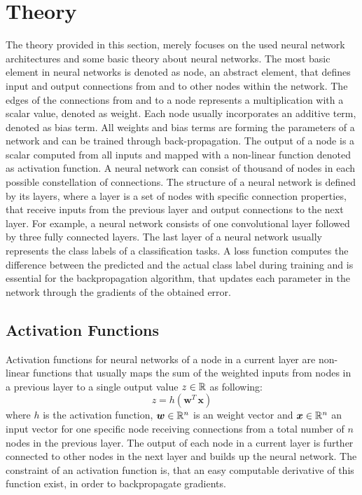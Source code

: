 
\section{Theory}\label{sec:nn_theory}
\thesisStateRevised
The theory provided in this section, merely focuses on the used neural network architectures and some basic theory about neural networks.
The most basic element in neural networks is denoted as node, an abstract element, that defines input and output connections from and to other nodes within the network.
The edges of the connections from and to a node represents a multiplication with a scalar value, denoted as weight.
Each node usually incorporates an additive term, denoted as bias term.
All weights and bias terms are forming the parameters of a network and can be trained through back-propagation.
The output of a node is a scalar computed from all inputs and mapped with a non-linear function denoted as activation function.
A neural network can consist of thousand of nodes in each possible constellation of connections.
The structure of a neural network is defined by its layers, where a layer is a set of nodes with specific connection properties, that receive inputs from the previous layer and output connections to the next layer.
For example, a neural network consists of one convolutional layer followed by three fully connected layers.
The last layer of a neural network usually represents the class labels of a classification tasks.
A loss function computes the difference between the predicted and the actual class label during training and is essential for the backpropagation algorithm, that updates each parameter in the network through the gradients of the obtained error.



\subsection{Activation Functions}\label{sec:nn_theory_acti}
Activation functions for neural networks of a node in a current layer are non-linear functions that usually maps the sum of the weighted inputs from nodes in a previous layer to a single output value $z \in \mathbb{R}$ as following:
\begin{equation}\label{eq:nn_theory_acti}
  z = h(\bm{w}^T \, \bm{x})
\end{equation}
where $h$ is the activation function, $\bm{w} \in \mathbb{R}^n$ is an weight vector and $\bm{x} \in \mathbb{R}^n$ an input vector for one specific node receiving connections from a total number of $n$ nodes in the previous layer.
The output of each node in a current layer is further connected to other nodes in the next layer and builds up the neural network.
The constraint of an activation function is, that an easy computable derivative of this function exist, in order to backpropagate gradients.

